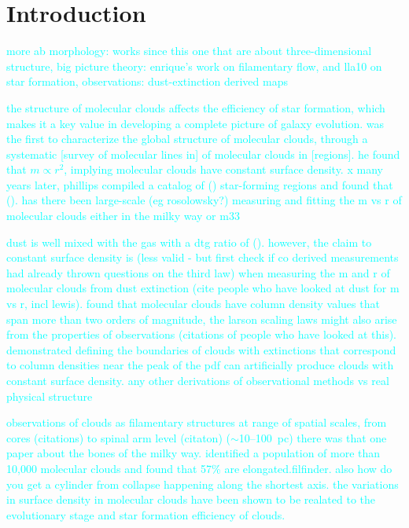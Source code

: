 \documentclass[twocolumn]{aastex631}
\begin{document}

\section{Introduction}\label{sec:intro}
\textcolor{cyan}{more ab morphology: works since this one that are about three-dimensional structure, big picture theory: enrique's work on filamentary flow, and lla10 on star formation, observations: dust-extinction derived maps}

\textcolor{cyan}{the structure of molecular clouds affects the efficiency of star formation, which makes it a key value in developing a complete picture of galaxy evolution. \citet{Larson1981} was the first to characterize the global structure of molecular clouds, through a systematic [survey of molecular lines in] of molecular clouds in [regions]. he found that $m \propto r^2$, implying molecular clouds have constant surface density. x many years later, phillips compiled a catalog of () star-forming regions and found that (). has there been large-scale (eg rosolowsky?) measuring and fitting the m vs r of molecular clouds either in the milky way or m33}

\textcolor{cyan}{dust is well mixed with the gas with a dtg ratio of (). however, the claim to constant surface density is (less valid - but first check if co derived measurements had already thrown questions on the third law) when measuring the m and r of molecular clouds from dust extinction (cite people who have looked at dust for m vs r, incl lewis). \citet{Lombardi2010} found that molecular clouds have column density values that span more than two orders of magnitude,}
\textcolor{cyan}{the larson scaling laws might also arise from the properties of observations (citations of people who have looked at this). \citet{BallesterosParedes2012} demonstrated defining the boundaries of clouds with extinctions that correspond to column densities near the peak of the pdf can artificially produce clouds with constant surface density. any other derivations of observational methods vs real physical structure}

\textcolor{cyan}{observations of clouds as filamentary structures at
range of spatial scales, from cores (citations) to spinal arm level (citaton)
($\sim$10--100~pc) \citep[e.g.,][]{Andre2010, Molinari2010, Li2013, Zucker2018,
Zhang2019, Schisano2020, Wang2020} there was that one paper about the bones of the milky way.  \citet{Neralwar2022} identified a population of more than 10,000 molecular clouds and found that 57\% are elongated.filfinder. also how do you get a cylinder from collapse happening along the shortest axis. the variations in surface density in molecular clouds have been shown to be realated to the evolutionary stage and star formation efficiency of clouds.}
\end{document}
